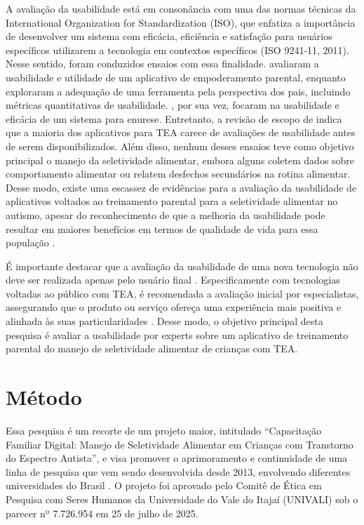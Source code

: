 \documentclass[portuguese]{textolivre}
\begin{document}
A avaliação da usabilidade está em consonância com uma das normas técnicas da International Organization for Standardization (ISO), que enfatiza a importância de desenvolver um sistema com eficácia, eficiência e satisfação para usuários específicos utilizarem a tecnologia em contextos específicos (ISO 9241-11, 2011). Nesse sentido, foram conduzidos ensaios com essa finalidade. \textcite{bonnot2021mobile} avaliaram a usabilidade e utilidade de um aplicativo de empoderamento parental, enquanto \textcite{parsons2019toby} exploraram a adequação de uma ferramenta pela perspectiva dos pais, incluindo métricas quantitativas de usabilidade. \textcite{mruzek2019toilettraining}, por sua vez, focaram na usabilidade e eficácia de um sistema para enurese. Entretanto, a revisão de escopo de \textcite{bharat2023mhealth} indica que a maioria dos aplicativos para TEA carece de avaliações de usabilidade antes de serem disponibilizados. Além disso, nenhum desses ensaios teve como objetivo principal o manejo da seletividade alimentar, embora alguns coletem dados sobre comportamento alimentar ou relatem desfechos secundários na rotina alimentar. Desse modo, existe uma escassez de evidências para a avaliação da usabilidade de aplicativos voltados ao treinamento parental para a seletividade alimentar no autismo, apesar do reconhecimento de que a melhoria da usabilidade pode resultar em maiores benefícios em termos de qualidade de vida para essa população \cite{mator2021usability}.

É importante destacar que a avaliação da usabilidade de uma nova tecnologia não deve ser realizada apenas pelo usuário final \cite{zulzalil2023checklistframework}. Especificamente com tecnologias voltadas ao público com TEA, é recomendada a avaliação inicial por especialistas, assegurando que o produto ou serviço ofereça uma experiência mais positiva e alinhada às suas particularidades \cite{valencia2022userexperience}. Desse modo, o objetivo principal desta pesquisa é avaliar a usabilidade por experts sobre um aplicativo de treinamento parental do manejo de seletividade alimentar de crianças com TEA.

\section{Método}\label{sec-normas}
Essa pesquisa é um recorte de um projeto maior, intitulado “Capacitação Familiar Digital: Manejo de Seletividade Alimentar em Crianças com Transtorno do Espectro Autista”, e visa promover o aprimoramento e continuidade de uma linha de pesquisa que vem sendo desenvolvida desde 2013, envolvendo diferentes universidades do Brasil \cite{bagaiolo2018capacitacao,bagaiolo2019community}. O projeto foi aprovado pelo Comitê de Ética em Pesquisa com Seres Humanos da Universidade do Vale do Itajaí (UNIVALI) sob o parecer nº 7.726.954 em 25 de julho de 2025.
\end{document}
